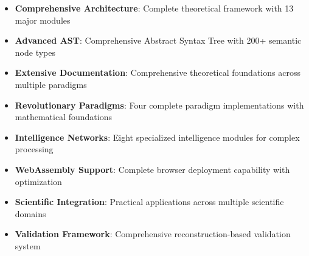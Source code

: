 \documentclass[12pt,a4paper,twoside]{article}
\begin{document}
\begin{itemize}
\item \textbf{Comprehensive Architecture}: Complete theoretical framework with 13 major modules
\item \textbf{Advanced AST}: Comprehensive Abstract Syntax Tree with 200+ semantic node types
\item \textbf{Extensive Documentation}: Comprehensive theoretical foundations across multiple paradigms
\item \textbf{Revolutionary Paradigms}: Four complete paradigm implementations with mathematical foundations
\item \textbf{Intelligence Networks}: Eight specialized intelligence modules for complex processing
\item \textbf{WebAssembly Support}: Complete browser deployment capability with optimization
\item \textbf{Scientific Integration}: Practical applications across multiple scientific domains
\item \textbf{Validation Framework}: Comprehensive reconstruction-based validation system
\end{itemize}
\end{document}
